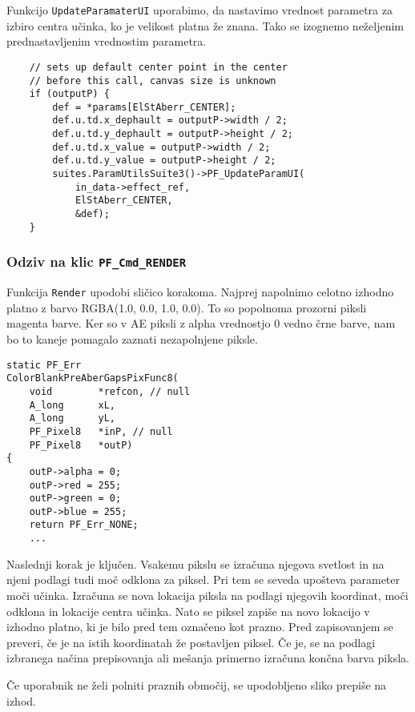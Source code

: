 \documentclass[a4paper, 12pt]{book}
\begin{document}
Funkcijo \verb!UpdateParamaterUI! uporabimo, da nastavimo vrednost parametra za izbiro centra učinka,
ko je velikost platna že znana.
Tako se izognemo neželjenim prednastavljenim vrednostim parametra.

\begin{verbatim}
    // sets up default center point in the center
    // before this call, canvas size is unknown 
    if (outputP) { 
        def = *params[ElStAberr_CENTER];
        def.u.td.x_dephault = outputP->width / 2;
        def.u.td.y_dephault = outputP->height / 2;
        def.u.td.x_value = outputP->width / 2;
        def.u.td.y_value = outputP->height / 2;
        suites.ParamUtilsSuite3()->PF_UpdateParamUI(
            in_data->effect_ref,
            ElStAberr_CENTER,
            &def);
    }
\end{verbatim}

\subsubsection{Odziv na klic \texttt{PF\_Cmd\_RENDER}}

Funkcija \verb!Render! upodobi sličico korakoma.
Najprej napolnimo celotno izhodno platno z barvo RGBA(1.0, 0.0, 1.0, 0.0).
To so popolnoma prozorni piksli magenta barve.
Ker so v AE piksli z alpha vrednostjo 0 vedno črne barve, nam bo to kaneje pomagalo zaznati nezapolnjene piksle.

\begin{verbatim}
static PF_Err
ColorBlankPreAberGapsPixFunc8(
    void        *refcon, // null
    A_long      xL,
    A_long      yL,
    PF_Pixel8   *inP, // null
    PF_Pixel8   *outP)
{
    outP->alpha = 0;
    outP->red = 255;
    outP->green = 0;
    outP->blue = 255;
    return PF_Err_NONE;
    ...
\end{verbatim}

Naslednji korak je ključen. 
Vsakemu pikslu se izračuna njegova svetlost in na njeni podlagi tudi moč odklona za piksel.
Pri tem se seveda upošteva parameter moči učinka.
Izračuna se nova lokacija piksla na podlagi njegovih koordinat, moči odklona in lokacije centra učinka.
Nato se piksel zapiše na novo lokacijo v izhodno platno, ki je bilo pred tem označeno kot prazno.
Pred zapisovanjem se preveri, če je na istih koordinatah že postavljen piksel.
Če je, se na podlagi izbranega načina prepisovanja ali mešanja primerno izračuna končna barva piksla.

Če uporabnik ne želi polniti praznih območij, se upodobljeno sliko prepiše na izhod.
\end{document}
